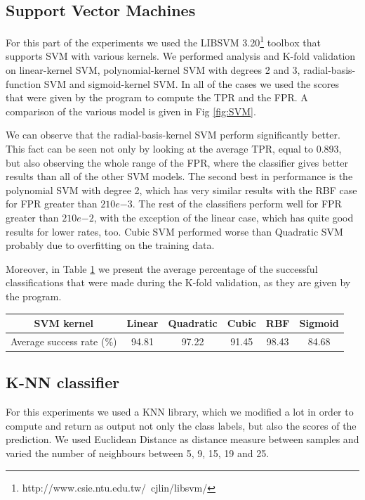 \subsection{Support Vector Machines}
\noindent For this part of the experiments we used the LIBSVM 3.20\footnote{http://www.csie.ntu.edu.tw/~cjlin/libsvm/} toolbox that supports SVM with various kernels.  We performed analysis and K-fold validation on linear-kernel SVM, polynomial-kernel SVM with degrees 2 and 3, radial-basis-function SVM and sigmoid-kernel SVM. In all of the cases we used the scores that were given by the program to compute the TPR and the FPR. A comparison of the various model is given in Fig \ref{fig:SVM}.

\noindent We can observe that the radial-basis-kernel SVM perform significantly better. This fact can be seen not only by looking at the average TPR, equal to 0.893, but also observing the whole range of the FPR, where the classifier gives better results than all of the other SVM models. The second best in performance is the polynomial SVM with degree 2, which has very similar results with the RBF case for FPR greater than $2 10e{-3}$. The rest of the classifiers perform well for FPR greater than $2 10e{-2}$, with the exception of the linear case, which has quite good results for lower rates, too.  Cubic SVM performed worse than Quadratic SVM probably due to overfitting on the training data.

\noindent Moreover, in Table \ref{table:SVM_success} we present the average percentage of the successful classifications that were made during the K-fold validation, as they are given by the program.

\begin{table}[h]
  \centering
  \begin{tabular}{ | c | c | c | c | c | c |}
  \hline
  SVM kernel & Linear & Quadratic & Cubic & RBF & Sigmoid \\ \hline
  Average success rate (\%) & 94.81 & 97.22 & 91.45 & 98.43 & 84.68 \\ \hline
  \end{tabular}
  \label{table:SVM_success}
\end{table}
    
\subsection{K-NN classifier}
\noindent For this experiments we used a KNN library, which we modified a lot in order to compute and return as output not only the class labels, but also the scores of the prediction.
We used Euclidean Distance as distance measure between samples and varied the number of neighbours between 5, 9, 15, 19 and 25. 

